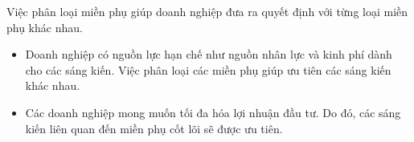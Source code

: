 

Việc phân loại miền phụ giúp doanh nghiệp đưa ra quyết định với từng loại miền phụ khác nhau.





 
\begin{itemize}
\item  Doanh nghiệp có nguồn lực hạn chế như nguồn nhân lực và kinh phí dành cho các sáng kiến. Việc phân loại các miền phụ giúp ưu tiên các sáng kiến khác nhau.
\item  Các doanh nghiệp mong muốn tối đa hóa lợi nhuận đầu tư. Do đó, các sáng kiến liên quan đến miền phụ cốt lõi sẽ được ưu tiên.
\end{itemize}
 




